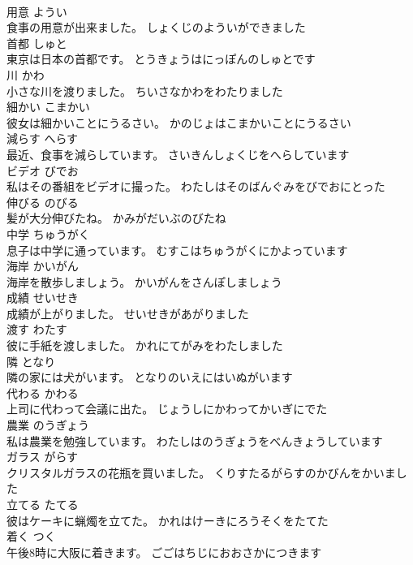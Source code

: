 \documentclass[8pt]{extreport}
\begin{document}
\begin{CJK}{UTF8}{min}
\\	用意	ようい	
\\	食事の用意が出来ました。	しょくじのよういができました	
\\	首都	しゅと	
\\	東京は日本の首都です。	とうきょうはにっぽんのしゅとです	
\\	川	かわ	
\\	小さな川を渡りました。	ちいさなかわをわたりました	
\\	細かい	こまかい	
\\	彼女は細かいことにうるさい。	かのじょはこまかいことにうるさい	
\\	減らす	へらす	
\\	最近、食事を減らしています。	さいきんしょくじをへらしています	
\\	ビデオ	びでお	
\\	私はその番組をビデオに撮った。	わたしはそのばんぐみをびでおにとった	
\\	伸びる	のびる	
\\	髪が大分伸びたね。	かみがだいぶのびたね	
\\	中学	ちゅうがく	
\\	息子は中学に通っています。	むすこはちゅうがくにかよっています	
\\	海岸	かいがん	
\\	海岸を散歩しましょう。	かいがんをさんぽしましょう	
\\	成績	せいせき	
\\	成績が上がりました。	せいせきがあがりました	
\\	渡す	わたす	
\\	彼に手紙を渡しました。	かれにてがみをわたしました	
\\	隣	となり	
\\	隣の家には犬がいます。	となりのいえにはいぬがいます	
\\	代わる	かわる	
\\	上司に代わって会議に出た。	じょうしにかわってかいぎにでた	
\\	農業	のうぎょう	
\\	私は農業を勉強しています。	わたしはのうぎょうをべんきょうしています	
\\	ガラス	がらす	
\\	クリスタルガラスの花瓶を買いました。	くりすたるがらすのかびんをかいました	
\\	立てる	たてる	
\\	彼はケーキに蝋燭を立てた。	かれはけーきにろうそくをたてた	
\\	着く	つく	
\\	午後8時に大阪に着きます。	ごごはちじにおおさかにつきます	

\end{CJK}
\end{document}
